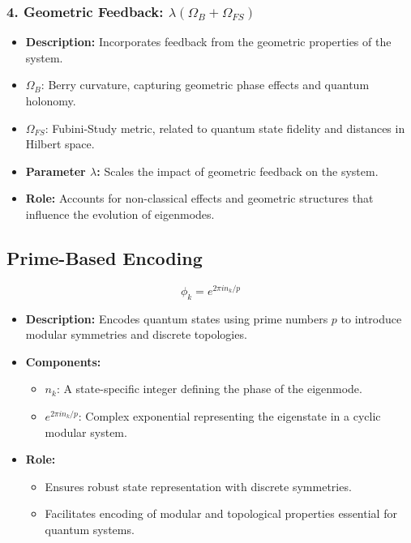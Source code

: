 \documentclass{article}
\theoremstyle{plain}
\begin{document}
\subsubsection*{4. Geometric Feedback: \(\lambda (\Omega_B + \Omega_{FS})\)}
\begin{itemize}
    \item \textbf{Description:} Incorporates feedback from the geometric properties of the system.
    \item \(\Omega_B\): Berry curvature, capturing geometric phase effects and quantum holonomy.
    \item \(\Omega_{FS}\): Fubini-Study metric, related to quantum state fidelity and distances in Hilbert space.
    \item \textbf{Parameter \(\lambda\):} Scales the impact of geometric feedback on the system.
    \item \textbf{Role:} Accounts for non-classical effects and geometric structures that influence the evolution of eigenmodes.
\end{itemize}

\subsection{Prime-Based Encoding}
\begin{equation}
\phi_k = e^{2 \pi i n_k / p}
\end{equation}
\begin{itemize}
    \item \textbf{Description:} Encodes quantum states using prime numbers \(p\) to introduce modular symmetries and discrete topologies.
    \item \textbf{Components:}
    \begin{itemize}
        \item \(n_k\): A state-specific integer defining the phase of the eigenmode.
        \item \(e^{2 \pi i n_k / p}\): Complex exponential representing the eigenstate in a cyclic modular system.
    \end{itemize}
    \item \textbf{Role:}
    \begin{itemize}
        \item Ensures robust state representation with discrete symmetries.
        \item Facilitates encoding of modular and topological properties essential for quantum systems.
    \end{itemize}
\end{itemize}
\end{document}
